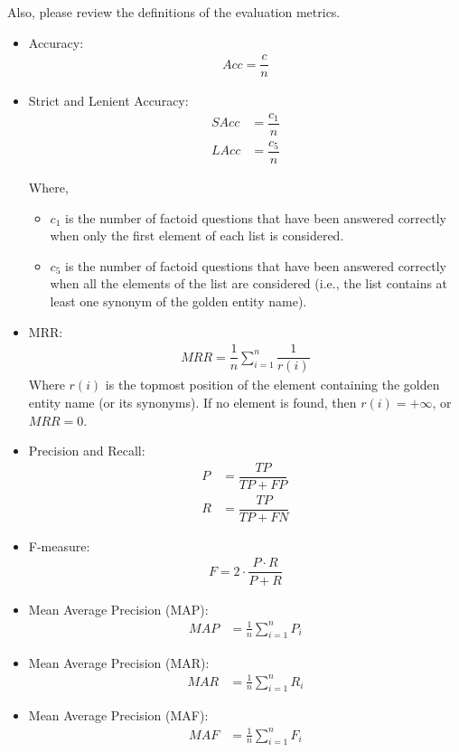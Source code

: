 Also, please review the definitions of the evaluation metrics. 

\begin{itemize}
\item Accuracy:
\begin{align}
Acc = \dfrac{c}{n} \tag{where $c$ is the number of correct answers and $n$ is the number of questions}
\end{align}
\item Strict and Lenient Accuracy:
\begin{align*}
SAcc &= \dfrac{c_1}{n} \\ 
LAcc &= \dfrac{c_5}{n}
\end{align*}

Where,
\begin{itemize}
\item  $c_1$ is the number of factoid questions that have been answered correctly when only the first element of each list is considered. 
\item $c_5$ is the number of factoid questions that have been answered correctly when all the elements of the list are considered (i.e., the list contains at least one synonym of the golden entity name).
\end{itemize}

\item MRR:
\begin{align*}
MRR = \dfrac{1}{n}\sum_{i=1}^n\dfrac{1}{r(i)}
\end{align*}
Where $r(i)$ is the topmost position of the element containing the golden entity name (or its synonyms). If no element is found, then $r(i)=+\infty$, or $MRR=0$.


\item Precision and Recall:
\begin{align}
P &= \dfrac{TP}{TP + FP} \tag{where TP are true positives, and FP are false positives}\\
R &= \dfrac{TP}{TP + FN} \tag{where TP are true positives, and FN are false negatives}
\end{align}

\item F-measure:
\begin{align}
F = 2 \cdot \dfrac{P\cdot R}{P + R} \tag{Harmonic mean of Precision and Recall}
\end{align}

\item Mean Average Precision (MAP):
\begin{align}
MAP &= \frac{1}{n} \sum^n_{i=1}P_i  \tag{To get the average precision for list of queries $q_1, q_2, \dots, q_n$.}
\end{align}
\item Mean Average Precision (MAR):
\begin{align}
MAR &= \frac{1}{n} \sum^n_{i=1}R_i  \tag{To get the average recall for list of queries $q_1, q_2, \dots, q_n$.}
\end{align}
\item Mean Average Precision (MAF):
\begin{align}
MAF &= \frac{1}{n} \sum^n_{i=1}F_i  \tag{To get the average F-measure for list of queries $q_1, q_2, \dots, q_n$.}
\end{align}
\end{itemize}
